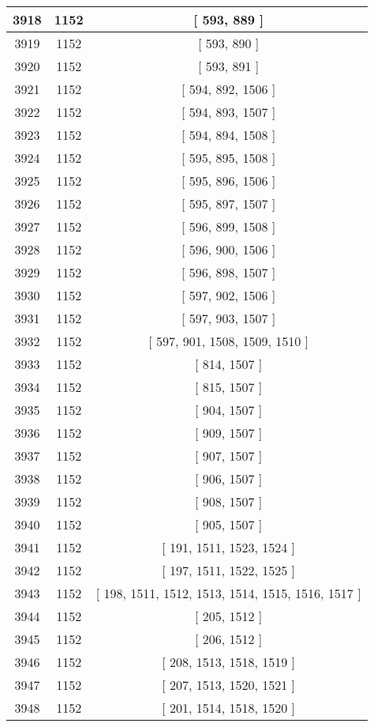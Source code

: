 \begin{center}
\begin{longtable}[H]{|| c c c ||}
\hline
3918 & 1152 & [ 593, 889 ] \\ 
\hline
3919 & 1152 & [ 593, 890 ] \\ 
\hline
3920 & 1152 & [ 593, 891 ] \\ 
\hline
3921 & 1152 & [ 594, 892, 1506 ] \\ 
\hline
3922 & 1152 & [ 594, 893, 1507 ] \\ 
\hline
3923 & 1152 & [ 594, 894, 1508 ] \\ 
\hline
3924 & 1152 & [ 595, 895, 1508 ] \\ 
\hline
3925 & 1152 & [ 595, 896, 1506 ] \\ 
\hline
3926 & 1152 & [ 595, 897, 1507 ] \\ 
\hline
3927 & 1152 & [ 596, 899, 1508 ] \\ 
\hline
3928 & 1152 & [ 596, 900, 1506 ] \\ 
\hline
3929 & 1152 & [ 596, 898, 1507 ] \\ 
\hline
3930 & 1152 & [ 597, 902, 1506 ] \\ 
\hline
3931 & 1152 & [ 597, 903, 1507 ] \\ 
\hline
3932 & 1152 & [ 597, 901, 1508, 1509, 1510 ] \\ 
\hline
3933 & 1152 & [ 814, 1507 ] \\ 
\hline
3934 & 1152 & [ 815, 1507 ] \\ 
\hline
3935 & 1152 & [ 904, 1507 ] \\ 
\hline
3936 & 1152 & [ 909, 1507 ] \\ 
\hline
3937 & 1152 & [ 907, 1507 ] \\ 
\hline
3938 & 1152 & [ 906, 1507 ] \\ 
\hline
3939 & 1152 & [ 908, 1507 ] \\ 
\hline
3940 & 1152 & [ 905, 1507 ] \\ 
\hline
3941 & 1152 & [ 191, 1511, 1523, 1524 ] \\ 
\hline
3942 & 1152 & [ 197, 1511, 1522, 1525 ] \\ 
\hline
3943 & 1152 & [ 198, 1511, 1512, 1513, 1514, 1515, 1516, 1517 ] \\ 
\hline
3944 & 1152 & [ 205, 1512 ] \\ 
\hline
3945 & 1152 & [ 206, 1512 ] \\ 
\hline
3946 & 1152 & [ 208, 1513, 1518, 1519 ] \\ 
\hline
3947 & 1152 & [ 207, 1513, 1520, 1521 ] \\ 
\hline
3948 & 1152 & [ 201, 1514, 1518, 1520 ] \\ 

\end{longtable}
\end{center}
